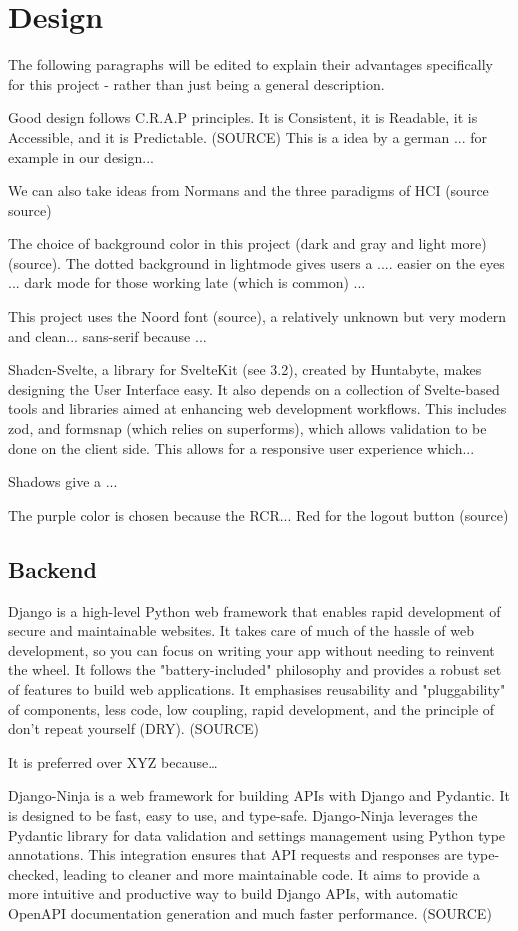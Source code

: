 \section{Design}
\begin{multicols}{2}
The following paragraphs will be edited to explain their advantages specifically for this project - rather than just being a general description.

Good design follows C.R.A.P principles. It is Consistent, it is Readable, it is Accessible, and it is Predictable. (SOURCE) This is a idea by a german ... for example in our design...

We can also take ideas from Normans and the three paradigms of HCI (source source)

The choice of background color in this project (dark and gray and light more) (source). The dotted background in lightmode gives users a .... easier on the eyes ... dark mode for those working late (which is common) ...

This project uses the Noord font (source), a relatively unknown but very modern and clean... sans-serif because ...

Shadcn-Svelte, a library for SvelteKit (see 3.2), created by Huntabyte, makes designing the User Interface easy. It also depends on a collection of Svelte-based tools and libraries aimed at enhancing web development workflows. This includes zod, and formsnap (which relies on superforms), which allows validation to be done on the client side. This allows for a responsive user experience which...

Shadows give a ...

The purple color is chosen because the RCR... Red for the logout button (source)
\subsection{Backend}
Django is a high-level Python web framework that enables rapid development of secure and maintainable websites. It takes care of much of the hassle of web development, so you can focus on writing your app without needing to reinvent the wheel. It follows the "battery-included" philosophy and provides a robust set of features to build web applications. It emphasises reusability and "pluggability" of components, less code, low coupling, rapid development, and the principle of don't repeat yourself (DRY). (SOURCE)

It is preferred over XYZ because…

Django-Ninja is a web framework for building APIs with Django and Pydantic. It is designed to be fast, easy to use, and type-safe. Django-Ninja leverages the Pydantic library for data validation and settings management using Python type annotations. This integration ensures that API requests and responses are type-checked, leading to cleaner and more maintainable code. It aims to provide a more intuitive and productive way to build Django APIs, with automatic OpenAPI documentation generation and much faster performance. (SOURCE)


\end{multicols}
